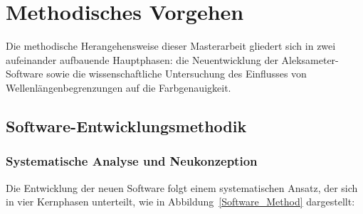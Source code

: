 \section{Methodisches Vorgehen}

Die methodische Herangehensweise dieser Masterarbeit gliedert sich in zwei aufeinander aufbauende Hauptphasen: die Neuentwicklung der Aleksameter-Software sowie die wissenschaftliche Untersuchung des Einflusses von Wellenlängenbegrenzungen auf die Farbgenauigkeit.

\subsection{Software-Entwicklungsmethodik}
\subsubsection{Systematische Analyse und Neukonzeption}

Die Entwicklung der neuen Software folgt einem systematischen Ansatz, der sich in vier Kernphasen unterteilt, wie in Abbildung~\ref{Software_Method} dargestellt:

